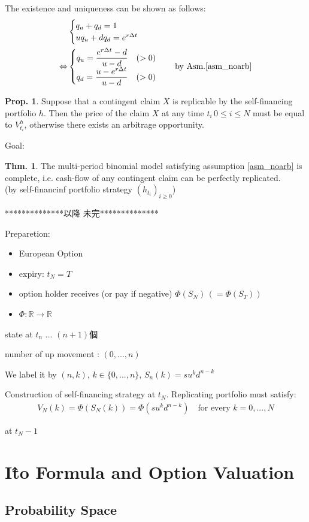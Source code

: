 \documentclass[a4paper,11pt]{jsarticle}
\theoremstyle{definition}
\newtheorem{theorem}{Thm.}[subsection]
\newtheorem{prop}{Prop.}[subsection]
\newcommand{\df}[2]{\dfrac{#1}{#2}}
\begin{document}
The existence and uniqueness can be shown as follows:
\begin{align}
  &\begin{cases}
    q_u+q_d=1 \\
    u q_u +d q_d = e^{r\Delta t}
  \end{cases} \\
  \Leftrightarrow
  &\begin{cases}
    q_u=\df{e^{r\Delta t}-d}{u-d} \quad (>0) \\
    q_d=\df{u-e^{r\Delta t}}{u-d} \quad (>0)
  \end{cases}
  \quad \mbox{by Asm.\ref{asm_noarb}}
\end{align}

\begin{prop}
  Suppose that a contingent claim $X$ is replicable by the
  self-financing portfolio $h$. Then the price of the claim $X$
  at any time $t_i \, 0\leq i\leq N$ must be equal to $V_{t_i}^h$,
  otherwise there exists an arbitrage opportunity. 
\end{prop}

Goal:
\begin{theorem}
  The multi-period binomial model satisfying assumption
  \ref{asm_noarb} is complete, i.e. cash-flow of any
  contingent claim can be perfectly replicated.\\
  (by self-financinf portfolio strategy $(h_{t_i})_{i\geq 0}$)
\end{theorem}


**************以降 未完**************

Preparetion:
\begin{itemize}
  \item European Option
  \item expiry: $t_N=T$
  \item option holder receives (or pay if negative)
  $\Phi(S_N) \, (=\Phi(S_T))$
  \item $\Phi : \mathbb{R}\to\mathbb{R}$ 
\end{itemize}

state at $t_n$ ... $(n+1)$個

number of up movement : $(0,...,n)$

We label it by $(n,k), \, k\in\{0,...,n\} , \,
S_n(k)=su^k d^{n-k}$

Construction of self-financing strategy at $t_N$.
Replicating portfolio must satisfy:
\begin{align}
  V_N(k)=\Phi(S_N(k))=\Phi(su^k d^{n-k})
  \quad \mbox{for every } k=0,...,N
\end{align}

at $t_N-1$



\newpage
\section{I\^{t}o Formula and Option Valuation}
\subsection{Probability Space}
\end{document}
